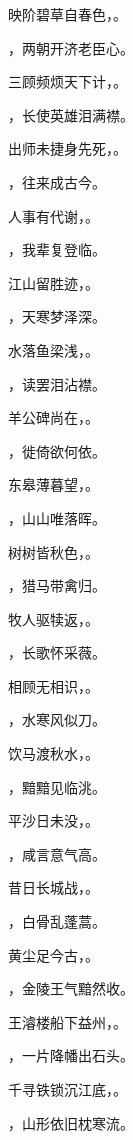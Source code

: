 \documentclass[12pt, a4paper, addpoints]{exam}
\begin{document}
\begin{questions}
\question[3] 映阶碧草自春色，\fillin。

\question[3] \fillin，两朝开济老臣心。

\question[3] 三顾频烦天下计，\fillin。

\question[3] \fillin，长使英雄泪满襟。

\question[3] 出师未捷身先死，\fillin。

\question[3] \fillin，往来成古今。

\question[3] 人事有代谢，\fillin。

\question[3] \fillin，我辈复登临。

\question[3] 江山留胜迹，\fillin。

\question[3] \fillin，天寒梦泽深。

\question[3] 水落鱼梁浅，\fillin。

\question[3] \fillin，读罢泪沾襟。

\question[3] 羊公碑尚在，\fillin。

\question[3] \fillin，徙倚欲何依。

\question[3] 东皋薄暮望，\fillin。

\question[3] \fillin，山山唯落晖。

\question[3] 树树皆秋色，\fillin。

\question[3] \fillin，猎马带禽归。

\question[3] 牧人驱犊返，\fillin。

\question[3] \fillin，长歌怀采薇。

\question[3] 相顾无相识，\fillin。

\question[3] \fillin，水寒风似刀。

\question[3] 饮马渡秋水，\fillin。

\question[3] \fillin，黯黯见临洮。

\question[3] 平沙日未没，\fillin。

\question[3] \fillin，咸言意气高。

\question[3] 昔日长城战，\fillin。

\question[3] \fillin，白骨乱蓬蒿。

\question[3] 黄尘足今古，\fillin。

\question[3] \fillin，金陵王气黯然收。

\question[3] 王濬楼船下益州，\fillin。

\question[3] \fillin，一片降幡出石头。

\question[3] 千寻铁锁沉江底，\fillin。

\question[3] \fillin，山形依旧枕寒流。


\end{questions}
\end{document}
